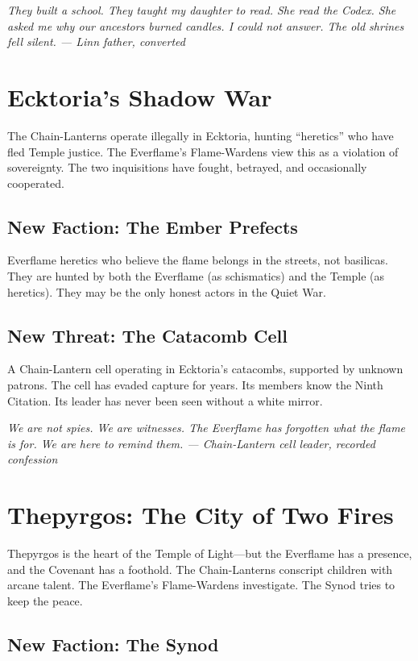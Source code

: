 \documentclass{book}
\newcommand{\citation}[1]{\textcolor{marginalia}{\small\textit{#1}}}
\begin{document}
\citation{They built a school. They taught my daughter to read. She read the \textit{Codex}. She asked me why our ancestors burned candles. I could not answer. The old shrines fell silent. --- Linn father, converted}

\chapter{Ecktoria's Shadow War}

The Chain-Lanterns operate illegally in Ecktoria, hunting ``heretics'' who have fled Temple justice. The Everflame's Flame-Wardens view this as a violation of sovereignty. The two inquisitions have fought, betrayed, and occasionally cooperated.

\section{New Faction: The Ember Prefects}

Everflame heretics who believe the flame belongs in the streets, not basilicas. They are hunted by both the Everflame (as schismatics) and the Temple (as heretics). They may be the only honest actors in the Quiet War.

\section{New Threat: The Catacomb Cell}

A Chain-Lantern cell operating in Ecktoria's catacombs, supported by unknown patrons. The cell has evaded capture for years. Its members know the Ninth Citation. Its leader has never been seen without a white mirror.

\citation{We are not spies. We are witnesses. The Everflame has forgotten what the flame is for. We are here to remind them. --- Chain-Lantern cell leader, recorded confession}

\chapter{Thepyrgos: The City of Two Fires}

Thepyrgos is the heart of the Temple of Light---but the Everflame has a presence, and the Covenant has a foothold. The Chain-Lanterns conscript children with arcane talent. The Everflame's Flame-Wardens investigate. The Synod tries to keep the peace.

\section{New Faction: The Synod}
\end{document}

